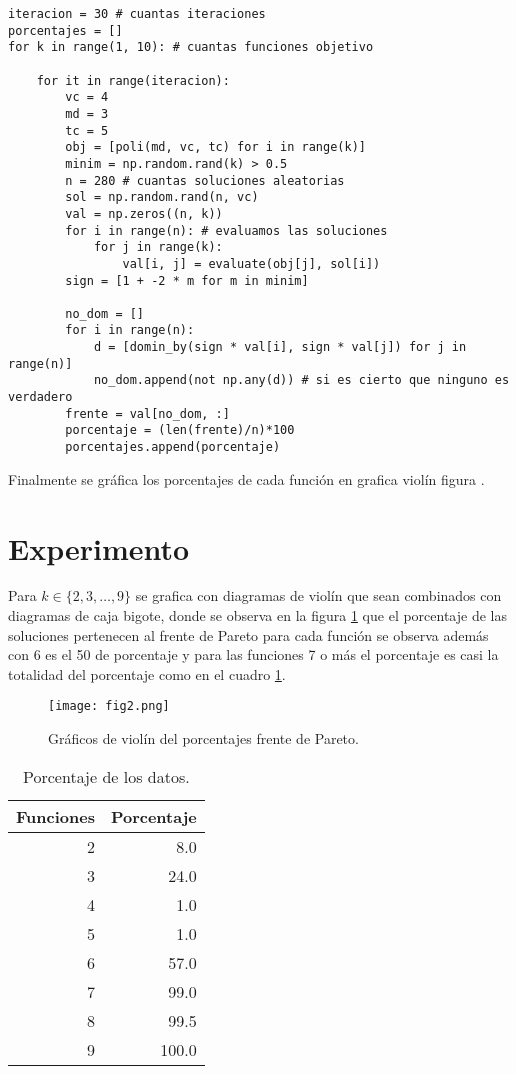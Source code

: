 \documentclass{article}
\begin{document}
\begin{lstlisting}
iteracion = 30 # cuantas iteraciones
porcentajes = []
for k in range(1, 10): # cuantas funciones objetivo

    for it in range(iteracion): 
        vc = 4
        md = 3
        tc = 5
        obj = [poli(md, vc, tc) for i in range(k)]
        minim = np.random.rand(k) > 0.5
        n = 280 # cuantas soluciones aleatorias
        sol = np.random.rand(n, vc)
        val = np.zeros((n, k))
        for i in range(n): # evaluamos las soluciones
            for j in range(k):
                val[i, j] = evaluate(obj[j], sol[i])
        sign = [1 + -2 * m for m in minim]
        
        no_dom = []
        for i in range(n):
            d = [domin_by(sign * val[i], sign * val[j]) for j in range(n)]
            no_dom.append(not np.any(d)) # si es cierto que ninguno es verdadero
        frente = val[no_dom, :]
        porcentaje = (len(frente)/n)*100
        porcentajes.append(porcentaje)
\end{lstlisting}

Finalmente se gráfica los porcentajes de cada función en grafica violín figura .  

\section{Experimento}
Para $k \in \{2,3,\ldots,9\}$ se grafica con diagramas de violín que sean combinados con diagramas de caja bigote, donde se observa en la figura \ref{fig2} que el porcentaje de las soluciones pertenecen al frente de Pareto para cada función se observa además con 6  es el 50 de porcentaje y para las funciones 7 o más el porcentaje es casi la totalidad del porcentaje como en el cuadro \ref{data}.
\begin{figure} [h!]%
    \centering
    \texttt{[image: fig2.png]} %
    \caption{Gráficos de violín del porcentajes frente de Pareto.}
    \label{fig2}
\end{figure}

\begin{table} [h]
\centering
\caption{Porcentaje de los datos.}
\begin{tabular}{rr}
  \hline
Funciones & Porcentaje \\ 
  \hline
2 & 8.0 \\
3 & 24.0\\
4 & 1.0 \\
5 & 1.0 \\
6 & 57.0 \\
7 & 99.0 \\
8 & 99.5 \\
9 & 100.0\\
\hline
\end{tabular}
\label{data}
\end{table}
 
\end{document}
